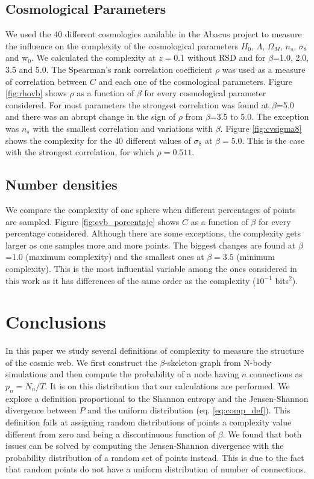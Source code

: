 \documentclass[fleqn,usenatbib]{mnras}
\begin{document}
\subsection{Cosmological Parameters}
We used the 40 different cosmologies available in the Abacus project to measure the influence on the complexity of the cosmological parameters $H_0$, $\Lambda$, $\Omega_{M}$, $n_s$, $\sigma_8$ and w$_0$. We calculated the complexity at $z=0.1$ without RSD and for $\beta$=1.0, 2.0, 3.5 and 5.0.  The Spearman’s rank correlation coefficient $\rho$ was used as a measure of correlation between $C$ and each one of the cosmological parameters. Figure \ref{fig:rhovb} shows $\rho$ as a function of $\beta$ for every cosmological parameter considered.  For most parameters the strongest correlation was found at $\beta$=5.0 and there was an abrupt change in the sign of $\rho$ from $\beta$=3.5 to 5.0. The exception was $n_{s}$ with the smallest correlation and variations with $\beta$. Figure \ref{fig:cvsigma8} shows the complexity for the 40 different values of $\sigma_{8}$ at $\beta=5.0$. This is the case with the strongest correlation, for which $\rho=0.511$.

\subsection{Number densities}
We compare the complexity of one sphere when different percentages of points are sampled. Figure \ref{fig:cvb_porcentaje} shows $C$ as a function of $\beta$ for every percentage considered. Although there are some exceptions, the complexity gets larger as one samples more and more points. The biggest changes are found at $\beta$=1.0 (maximum complexity) and the smallest ones at $\beta=3.5$ (minimum complexity). This is the most influential variable among the ones considered in this work as it has differences of the same order as the complexity ($10^{-1}$ bits$^2$).






\section{Conclusions}

In this paper we study several definitions of complexity to measure the structure of the cosmic web. We first construct the $\beta$-skeleton graph from N-body simulations and then compute the probability of a node having $n$ connections as $p_{n}=N_{n}/T$. It is on this distribution that our calculations are performed. We explore a definition proportional to the Shannon entropy and the Jensen-Shannon divergence between $P$ and the uniform distribution (eq. \ref{eq:comp_def}). This definition fails at assigning random distributions of points a complexity value different from zero and being a discontinuous function of $\beta$. We found that both issues can be solved by computing the Jensen-Shannon divergence with the probability distribution of a random set of points instead. This is due to the fact that random points do not have a uniform distribution of number of connections. 
\end{document}
